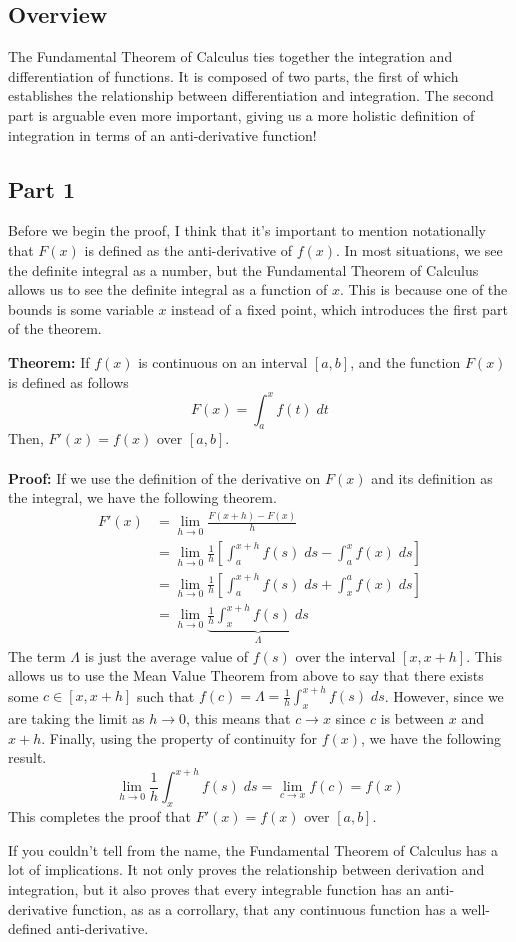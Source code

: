 \documentclass[8pt]{extarticle}
\begin{document}
\subsection{Overview}
The Fundamental Theorem of Calculus ties together the integration and differentiation of functions. 
It is composed of two parts, the first of which establishes the relationship between differentiation and integration. The second part is arguable even more important, giving us a more holistic definition of integration in terms of an anti-derivative function!
\subsection{Part 1}
Before we begin the proof, I think that it's important to mention notationally that $F(x)$ is defined as the anti-derivative of $f(x)$. In most situations, we see the definite integral as a number, but the Fundamental Theorem of Calculus allows us to see the definite integral as a function of $x$. This is because one of the bounds is some variable $x$ instead of a fixed point, which introduces the first part of the theorem.
\begin{boxedsection}
\textbf{Theorem:} If $f(x)$ is continuous on an interval $[a,b]$, and the function $F(x)$ is defined as follows
$$
F(x) = \int_a^x f(t)\;dt
$$
Then, $F'(x) = f(x)$ over $[a,b]$. \\
\\
\textbf{Proof:} If we use the definition of the derivative on $F(x)$ and its definition as the integral, we have the following theorem.
\begin{align*} 
  F'(x) &= \lim_{h\rightarrow 0} \frac{F(x+h) - F(x)}{h}\\
  &= \lim_{h\rightarrow 0} \frac{1}{h} \left[\int_a^{x+h} f(s)\;ds - \int_a^x f(x)\;ds \right]\\
  &= \lim_{h\rightarrow 0} \frac{1}{h} \left[\int_a^{x+h} f(s)\;ds + \int_x^a f(x)\;ds \right]\\
  &= \lim_{h\rightarrow 0} \underbrace{\frac{1}{h} \int_x^{x+h} f(s)\;ds}_{\Lambda}
\end{align*}
The term $\Lambda$ is just the average value of $f(s)$ over the interval $[x,x+h]$. This allows us to use the Mean Value Theorem from above to say that there exists some $c \in [x,x+h]$ such that $f(c) = \Lambda = \frac{1}{h} \int_x^{x+h} f(s)\;ds$.
However, since we are taking the limit as $h \rightarrow 0$, this means that $c \rightarrow x$ since $c$ is between $x$ and $x + h$. Finally, using the property of continuity for $f(x)$, we have the following result.
$$
\lim_{h\rightarrow 0} \frac{1}{h} \int_x^{x+h} f(s)\;ds = \lim_{c \rightarrow x} f(c) = f(x)
$$
This completes the proof that $F'(x) = f(x)$ over $[a,b]$.
\end{boxedsection}
If you couldn't tell from the name, the Fundamental Theorem of Calculus has a lot of implications. It not only proves the relationship between derivation and integration, but it also proves that every integrable function has an anti-derivative function, as as a corrollary, that any continuous function has a well-defined anti-derivative.
\end{document}
